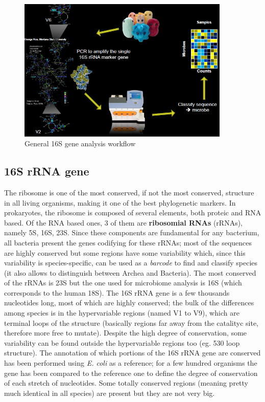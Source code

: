     \begin{figure}[!h]
      \centering
      \includegraphics[width=0.9\textwidth]{general_workflow.png}
      \caption{\label{fig:general_workflow}General 16S gene analysis workflow}
    \end{figure}

  \subsection{16S rRNA gene}
    The ribosome is one of the most conserved, if not the most conserved, structure in all living organisms, making it one of the best phylogenetic markers. In prokaryotes, the ribosome is composed of several elements, both proteic and RNA based. Of the RNA based ones, 3 of them are \textbf{ribosomial RNAs} (rRNAs), namely 5S, 16S, 23S. Since these components are fundamental for any bacterium, all bacteria present the genes codifying for these rRNAs; most of the sequences are highly conserved but some regions have some variability which, since this variability is species-specific, can be used as a \textit{barcode} to find and classify species (it also allows to distinguish between Archea and Bacteria).
    The most conserved of the rRNAs is 23S but the one used for microbiome analysis is 16S (which corresponds to the human 18S). The 16S rRNA gene is a few thousands nucleotides long, most of which are highly conserved; the bulk of the differences among species is in the hypervariable regions (named V1 to V9), which are terminal loops of the structure (basically regions far away from the catalityc site, therefore more free to mutate). Despite the high degree of conservation, some variability can be found outside the hypervariable regions too (eg. 530 loop structure).
    The annotation of which portions of the 16S rRNA gene are conserved has been performed using \textit{E. coli} as a reference; for a few hundred organisms the gene has been compared to the reference one to define the degree of conservation of each stretch of nucleotides. Some totally conserved regions (meaning pretty much identical in all species) are present but they are not very big.

